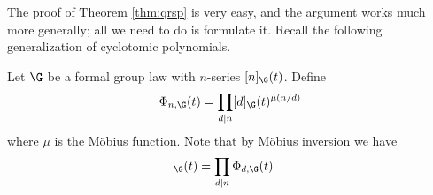%

The proof of Theorem \ref{thm:qrsp} is very easy, and the argument works much more generally; all we need to do is formulate it. Recall the following generalization of cyclotomic polynomials.
\begin{definition}
  \label{def:fgl-cyclotomic}
  Let $\G$ be a formal group law with $n$-series $[n]_\G(t)$. Define
  \[ \Phi_{n,\G}(t) = \prod_{d\mid n}[d]_\G(t)^{\mu(n/d)} \]
  where $\mu$ is the M\"obius function. Note that by M\"obius inversion we have
  \begin{align*}
    [n]_\G(t) &= \prod_{d\mid n}\Phi_{d,\G}(t)
  \end{align*}
\end{definition}

